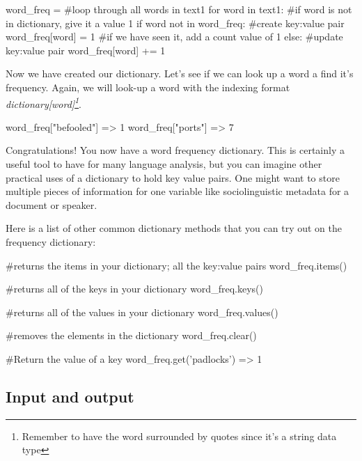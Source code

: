 \begin{python}
word_freq = {}
#loop through all words in text1
for word in text1:
    #if word is not in dictionary, give it a value 1
    if word not in word_freq:
        #create key:value pair
        word_freq[word] = 1
    #if we have seen it, add a count value of 1
    else:
        #update key:value pair
        word_freq[word] += 1
\end{python}

Now we have created our dictionary. Let's see if we can look up a word a find it's frequency. Again, we will look-up a word with the indexing format \textit{dictionary[word]\footnote{Remember to have the word surrounded by quotes since it's a string data type}}.
\begin{python}
word_freq["befooled"]
=> 1
word_freq["ports"]
=> 7
\end{python}
Congratulations! You now have a word frequency dictionary. This is certainly a useful tool to have for many language analysis, but you can imagine other practical uses of a dictionary to hold key value pairs. One might want to store multiple pieces of information for one variable like  sociolinguistic metadata for a document or speaker. 

Here is a list of other common dictionary methods that you can try out on the frequency dictionary:

\begin{python}
#returns the items in your dictionary; all the key:value pairs
word_freq.items()

#returns all of the keys in your dictionary
word_freq.keys()

#returns all of the values in your dictionary
word_freq.values()

#removes the elements in the dictionary
word_freq.clear()

#Return the value of a key
word_freq.get('padlocks')
=> 1
\end{python}

\subsection{Input and output}

